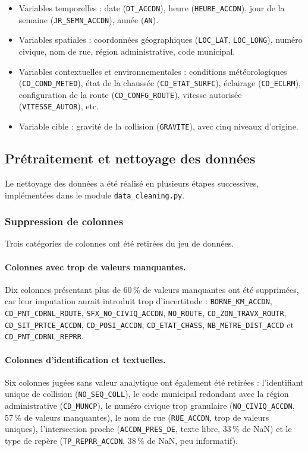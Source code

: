 \documentclass[12pt]{article}
\begin{document}
\begin{itemize}
  \item {Variables temporelles :} date (\texttt{DT\_ACCDN}),
        heure (\texttt{HEURE\_ACCDN}), jour de la semaine
        (\texttt{JR\_SEMN\_ACCDN}), année (\texttt{AN}).
  \item {Variables spatiales :} coordonnées géographiques
        (\texttt{LOC\_LAT}, \texttt{LOC\_LONG}), numéro civique,
        nom de rue, région administrative, code municipal.
  \item {Variables contextuelles et environnementales :}
        conditions météorologiques (\texttt{CD\_COND\_METEO}),
        état de la chaussée (\texttt{CD\_ETAT\_SURFC}),
        éclairage (\texttt{CD\_ECLRM}),
        configuration de la route (\texttt{CD\_CONFG\_ROUTE}),
        vitesse autorisée (\texttt{VITESSE\_AUTOR}), etc.
  \item {Variable cible :} gravité de la collision
        (\texttt{GRAVITE}), avec cinq niveaux d'origine.
\end{itemize}
 
\subsection{Prétraitement et nettoyage des données}
 
Le nettoyage des données a été réalisé en plusieurs étapes successives,
implémentées dans le module \texttt{data\_cleaning.py}.
 
\subsubsection{Suppression de colonnes}
 
Trois catégories de colonnes ont été retirées du jeu de données.
 
\paragraph{Colonnes avec trop de valeurs manquantes.}
Dix colonnes présentant plus de 60\,\% de valeurs manquantes ont été
supprimées, car leur imputation aurait introduit trop d'incertitude :
\texttt{BORNE\_KM\_ACCDN}, \texttt{CD\_PNT\_CDRNL\_ROUTE},
\texttt{SFX\_NO\_CIVIQ\_ACCDN}, \texttt{NO\_ROUTE},
\texttt{CD\_ZON\_TRAVX\_ROUTR}, \texttt{CD\_SIT\_PRTCE\_ACCDN},
\texttt{CD\_POSI\_ACCDN}, \texttt{CD\_ETAT\_CHASS},
\texttt{NB\_METRE\_DIST\_ACCD} et \texttt{CD\_PNT\_CDRNL\_REPRR}.
 
\paragraph{Colonnes d'identification et textuelles.}
Six colonnes jugées sans valeur analytique ont également été retirées :
l'identifiant unique de collision (\texttt{NO\_SEQ\_COLL}),
le code municipal redondant avec la région administrative
(\texttt{CD\_MUNCP}), le numéro civique trop granulaire
(\texttt{NO\_CIVIQ\_ACCDN}, 57\,\% de valeurs manquantes),
le nom de rue (\texttt{RUE\_ACCDN}, trop de valeurs uniques),
l'intersection proche (\texttt{ACCDN\_PRES\_DE}, texte libre,
33\,\% de NaN) et le type de repère (\texttt{TP\_REPRR\_ACCDN},
38\,\% de NaN, peu informatif).
 
\end{document}
